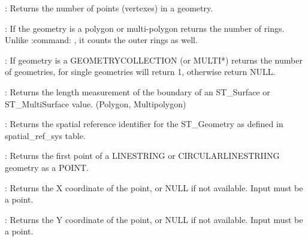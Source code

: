 \documentclass[a4paper,11pt,english]{sphinxmanual}
\begin{document}
: Returns the number of points (vertexes) in a geometry.

: If the geometry is a polygon or multi-polygon returns the number of rings. Unlike :command: , it counts the outer rings as well.

: If geometry is a GEOMETRYCOLLECTION (or MULTI*) returns the number of geometries, for single geometries will return 1, otherwise return NULL.

: Returns the length measurement of the boundary of an ST\_Surface or ST\_MultiSurface value. (Polygon, Multipolygon)

: Returns the spatial reference identifier for the ST\_Geometry as defined in spatial\_ref\_sys table.

: Returns the first point of a LINESTRING or CIRCULARLINESTRIING geometry as a POINT.

: Returns the X coordinate of the point, or NULL if not available. Input must be a point.

: Returns the Y coordinate of the point, or NULL if not available. Input must be a point.
\end{document}
